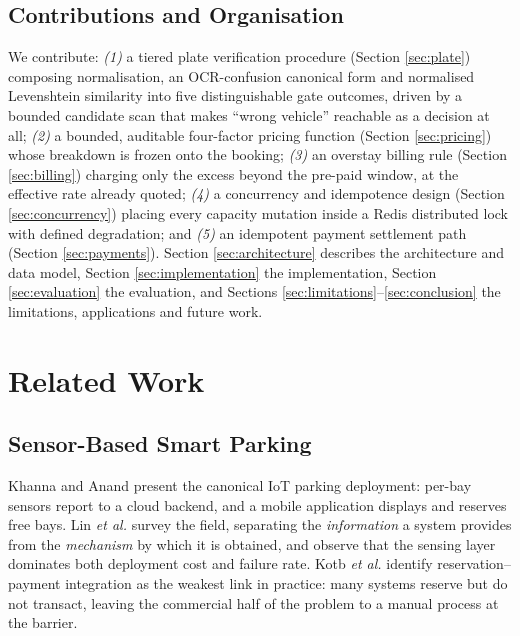 \documentclass[journal,onecolumn,11pt]{IEEEtran}
\begin{document}
\subsection{Contributions and Organisation}

We contribute: \emph{(1)} a tiered plate verification procedure (Section
\ref{sec:plate}) composing normalisation, an OCR-confusion canonical form and
normalised Levenshtein similarity \cite{levenshtein1966} into five
distinguishable gate outcomes, driven by a bounded candidate scan that makes
``wrong vehicle'' reachable as a decision at all; \emph{(2)} a bounded,
auditable four-factor pricing function (Section \ref{sec:pricing}) whose
breakdown is frozen onto the booking; \emph{(3)} an overstay billing rule
(Section \ref{sec:billing}) charging only the excess beyond the pre-paid
window, at the effective rate already quoted; \emph{(4)} a concurrency and
idempotence design (Section \ref{sec:concurrency}) placing every capacity
mutation inside a Redis distributed lock \cite{redislocks} with defined
degradation; and \emph{(5)} an idempotent payment settlement path (Section
\ref{sec:payments}). Section \ref{sec:architecture} describes the architecture
and data model, Section \ref{sec:implementation} the implementation, Section
\ref{sec:evaluation} the evaluation, and Sections
\ref{sec:limitations}--\ref{sec:conclusion} the limitations, applications and
future work.

\section{Related Work}
\label{sec:related}

\subsection{Sensor-Based Smart Parking}

Khanna and Anand \cite{khanna2016iot} present the canonical IoT parking
deployment: per-bay sensors report to a cloud backend, and a mobile application
displays and reserves free bays. Lin \emph{et al.} \cite{lin2017survey} survey
the field, separating the \emph{information} a system provides from the
\emph{mechanism} by which it is obtained, and observe that the sensing layer
dominates both deployment cost and failure rate. Kotb \emph{et al.}
\cite{kotb2016review} identify reservation--payment integration as the weakest
link in practice: many systems reserve but do not transact, leaving the
commercial half of the problem to a manual process at the barrier.
\end{document}
